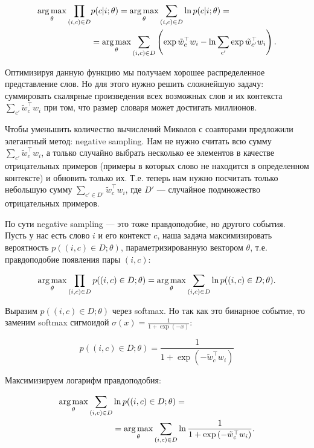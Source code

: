 \begin{equation}
\begin{aligned}
 \operatorname*{arg\,max}_{\theta} \prod_{(i,c)\in D} & p(c|i;\theta) = \operatorname*{arg\,max}_{\theta} \sum_{(i,c)\in D}\ln{p(c|i;\theta)} =
\\
 & = \operatorname*{arg\,max}_{\theta} \sum_{(i,c)\in D} \left(\exp{\tilde{w}_c^\top w_i} - \ln{\sum_{c'}
\exp{\tilde{w}_{c'}^\top w_i}}\right).
\end{aligned}
\end{equation}

Оптимизируя данную функцию мы получаем хорошее распределенное представление слов. Но для этого нужно решить
сложнейшую задачу: суммировать скалярные произведения всех возможных слов и их контекста $\sum_{c'}
\tilde{w}_c^\top w_i$ при том, что размер словаря может достигать миллионов.

\bigskip
Чтобы уменьшить количество вычислений Миколов с соавторами \cite{Mikolov:2} предложили элегантный метод:
negative sampling. Нам не нужно считать всю сумму $\sum_{c'} \tilde{w}_c^\top w_i$, а только случайно выбрать
несколько ее элементов в качестве отрицательных примеров (примеры в которых слово не находится в определенном
контексте) и обновить только их. Т.е. теперь нам нужно посчитать только небольшую сумму $\sum_{c' \in D'}
\tilde{w}_c^\top w_i$, где $D'$ --- случайное подмножество отрицательных примеров.

\bigskip
По сути negative sampling --- это тоже правдоподобие, но другого события. Пусть у нас есть слово $i$ и его
контекст $c$, наша задача максимизировать вероятность $p((i,c) \in D; \theta)$, параметризированную вектором
$\theta$, т.е. правдоподобие появления пары $(i,c)$:

\begin{equation}
 \operatorname*{arg\,max}_{\theta} \prod_{(i,c)\in D} p((i,c)\in D;\theta) = \operatorname*{arg\,max}_{\theta} \sum_{(i,c)\in D} \ln{
p((i,c)\in D;\theta)}.
\end{equation}

Выразим $p((i,c)\in D;\theta)$ через softmax. Но так как это бинарное событие, то заменим softmax сигмоидой
$\sigma (x) = \frac{1}{1+\exp{(-x)}}$:

\begin{equation}
 p((i,c)\in D;\theta) = \frac{1}{1+\exp{(-\tilde{w}_c^{\top} w_i)}}
\end{equation}

Максимизируем логарифм правдоподобия:

\begin{equation} \label{eq:negLikelyhood}
\begin{aligned}
 \operatorname*{arg\,max}_{\theta} \sum_{(i,c)\in D} & \ln{p((i,c)\in D;\theta)} = \\
 & = \operatorname*{arg\,max}_{\theta} \sum_{(i,c)\in D} \ln{\frac{1}{1+\exp{(-\tilde{w}_c^{\top} w_i)}}}.
\end{aligned}
\end{equation}

